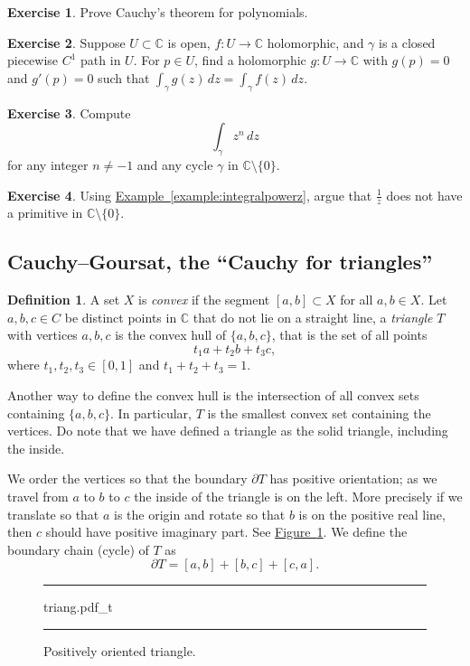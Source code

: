 \documentclass[12pt,openany]{book}
\newcommand{\C}{{\mathbb{C}}}
\newcommand{\myindex}[1]{#1\index{#1}}
\theoremstyle{plain}
\theoremstyle{remark}
\theoremstyle{definition}
\newtheorem{defn}[thm]{Definition}
\newenvironment{exbox}{%
    \def\FrameCommand{\vrule width 1pt \relax\hspace {10pt}}%
    \MakeFramed {\advance \hsize -\width \FrameRestore }%
}{%
    \endMakeFramed
}
\newenvironment{myfig}{%
\begin{figure}[h!t]
\noindent\rule{\textwidth}{0.4pt}\vspace{12pt}\par\centering}%
{\par\noindent\rule{\textwidth}{0.4pt}
\end{figure}}
\theoremstyle{exercise}
\newtheorem{exercise}{Exercise}[section]
\theoremstyle{example}
\newcommand{\figureref}[1]{\hyperref[#1]{Figure~\ref*{#1}}}
\newcommand{\exampleref}[1]{\hyperref[#1]{Example~\ref*{#1}}}
\begin{document}
\begin{exbox}
\begin{exercise}
Prove Cauchy's theorem for polynomials.
\end{exercise}

\begin{exercise}
Suppose $U \subset \C$ is open, $f \colon U \to \C$ holomorphic, and
$\gamma$ is a closed piecewise $C^1$ path in $U$.  
For $p \in U$, find a holomorphic $g \colon U \to \C$ with $g(p) = 0$
and $g'(p) = 0$ such that $\int_\gamma g(z)\, dz = \int_\gamma f(z) \, dz$.
\end{exercise}

\begin{exercise}
Compute
\begin{equation*}
\int_\gamma z^n \, dz
\end{equation*}
for any integer $n \not= -1$ and any cycle $\gamma$ in
$\C \setminus \{ 0 \}$.
\end{exercise}

\begin{exercise}
Using \exampleref{example:integralpowerz}, argue that $\frac{1}{z}$ does
not have a primitive in $\C \setminus \{ 0 \}$.
\end{exercise}
\end{exbox}

\subsection{Cauchy--Goursat, the ``Cauchy for triangles''}

\begin{defn}
A set $X$ is \emph{\myindex{convex}} if the segment $[a,b] \subset X$ for all $a,b \in
X$.
Let $a,b,c \in C$ be distinct points in $\C$ that do not lie on a
straight line, a \emph{\myindex{triangle}} $T$
with vertices $a,b,c$ is the convex hull
of $\{ a,b,c \}$, that is
the set of all points
\begin{equation*}
t_1 a + t_2 b + t_3 c ,
\end{equation*}
where $t_1,t_2,t_3 \in [0,1]$ and $t_1+t_2+t_3 = 1$.
\end{defn}

Another way to define
the convex hull is the intersection of all convex sets containing $\{ a,b,c \}$.
In particular, $T$ is the smallest convex set containing the vertices.
Do note that we have defined a triangle as the solid triangle, including
the inside.

We order the vertices so that the boundary $\partial T$ has positive orientation;
as we travel from $a$ to $b$ to $c$ the inside of the triangle 
is on the left.  More precisely if we translate so that $a$ is
the origin and rotate so that $b$ is on the positive real line, then $c$
should have positive imaginary part.  See \figureref{fig:triang}.  We define the boundary chain (cycle)
of $T$ as
\begin{equation*}
\partial T = [a,b] + [b,c] + [c,a] .
\end{equation*}
\begin{myfig}
{triang.pdf_t}
\caption{Positively oriented triangle.%
\label{fig:triang}}
\end{myfig}
\end{document}
